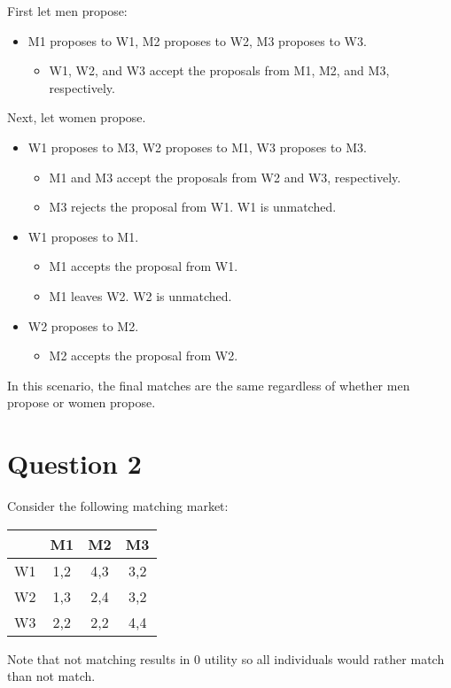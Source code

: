\documentclass[11pt]{article} %
\begin{document}
First let men propose:
\begin{itemize}
\item M1 proposes to W1, M2 proposes to W2, M3 proposes to W3.
\begin{itemize}
\item W1, W2, and W3 accept the proposals from M1, M2, and M3, respectively.
\end{itemize}
\end{itemize}

Next, let women propose.
\begin{itemize}
\item W1 proposes to M3, W2 proposes to M1, W3 proposes to M3.
\begin{itemize}
\item M1 and M3 accept the proposals from W2 and W3, respectively.
\item M3 rejects the proposal from W1. W1 is unmatched.
\end{itemize}
\item W1 proposes to M1.
\begin{itemize}
\item M1 accepts the proposal from W1.
\item M1 leaves W2. W2 is unmatched.
\end{itemize}
\item W2 proposes to M2.
\begin{itemize}
\item M2 accepts the proposal from W2.
\end{itemize}
\end{itemize}

In this scenario, the final matches are the same regardless of whether men propose or women propose.

\section{Question 2}
Consider the following matching market:

\begin{center}
\begin{tabular}{c|ccc}
 & M1 & M2 & M3\\
\hline
W1 & 1,2 & 4,3 & 3,2 \\
W2 & 1,3 & 2,4 & 3,2 \\
W3 & 2,2 & 2,2 & 4,4
\end{tabular}
\end{center}

Note that not matching results in $0$ utility so all individuals would rather match than not match.
\end{document}
